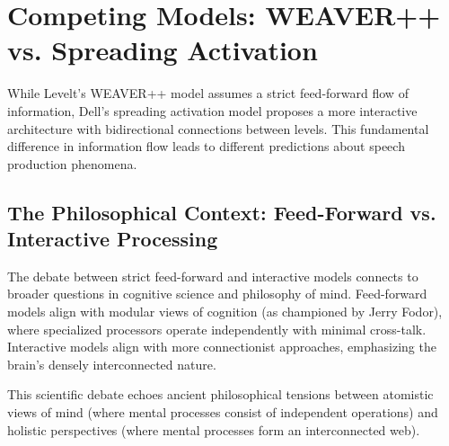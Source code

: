 \documentclass[12pt,a4paper]{article}
\begin{document}
\section{Competing Models: WEAVER++ vs. Spreading Activation}

While Levelt's WEAVER++ model assumes a strict feed-forward flow of information, Dell's spreading activation model proposes a more interactive architecture with bidirectional connections between levels. This fundamental difference in information flow leads to different predictions about speech production phenomena.

\subsection{The Philosophical Context: Feed-Forward vs. Interactive Processing}

The debate between strict feed-forward and interactive models connects to broader questions in cognitive science and philosophy of mind. Feed-forward models align with modular views of cognition (as championed by Jerry Fodor), where specialized processors operate independently with minimal cross-talk. Interactive models align with more connectionist approaches, emphasizing the brain's densely interconnected nature.

This scientific debate echoes ancient philosophical tensions between atomistic views of mind (where mental processes consist of independent operations) and holistic perspectives (where mental processes form an interconnected web).
\end{document}
